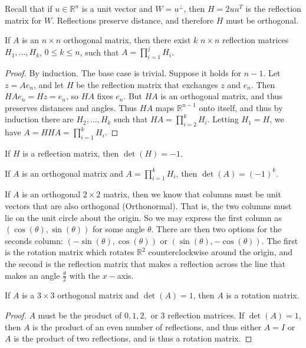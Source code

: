 \documentclass[crop=false,class=book,oneside]{standalone}
\begin{document}
        Recall that if $u\in \mathbb{R}^n$ is a unit vector and $W = u^{\perp}$, then $H=2uu^T$ is the reflection matrix for $W$. Reflections preserve distance, and therefore $H$ must be orthogonal.
        \newpage
        \begin{theorem}
        If $A$ is an $n\times n$ orthogonal matrix, then there exist $k$ $n\times n$ reflection matrices $H_1,\hdots, H_k$, $0\leq k \leq n$, such that $A = \prod_{i=1}^{j}H_i$.
        \end{theorem}
        \begin{proof}
        By induction. The base case is trivial. Suppose it holds for $n-1$. Let $z = Ae_n$, and let $H$ be the reflection matrix that exchanges $z$ and $e_n$. Then $HAe_n = Hz = e_n$, so $HA$ fixes $e_n$. But $HA$ is an orthogonal matrix, and thus preserves distances and angles. Thus $HA$ maps $\mathbb{R}^{n-1}$ onto itself, and thus by induction there are $H_2,\hdots, H_k$ such that $HA = \prod_{i=2}^{k} H_i$. Letting $H_{1}=H$, we have $A = HHA = \prod_{i=1}^{k}H_i$.
        \end{proof}
        \begin{theorem}
        If $H$ is a reflection matrix, then $\det(H) = -1$.
        \end{theorem}
        \begin{theorem}
        If $A$ is an orthogonal matrix and $A=\prod_{i=1}^{k} H_i$, then $\det(A) = (-1)^k$.
        \end{theorem}
        If $A$ is an orthogonal $2\times 2$ matrix, then we know that columns must be unit vectors that are also orthogonal (Orthonormal). That is, the two columns must lie on the unit circle about the origin. So we may express the first column as $(\cos(\theta),\sin(\theta))$ for some angle $\theta$. There are then two options for the seconds column: $(-\sin(\theta),\cos(\theta))$ or $(\sin(\theta),-\cos(\theta))$. The first is the rotation matrix which rotates $\mathbb{R}^2$ counterclockwise around the origin, and the second is the reflection matrix that makes a reflection across the line that makes an angle $\frac{\theta}{2}$ with the $x-$axis. 
        \begin{theorem}
        If $A$ is a $3\times 3$ orthogonal matrix and $\det(A) = 1$, then $A$ is a rotation matrix.
        \end{theorem}
        \begin{proof}
        $A$ must be the product of $0,1,2,$ or $3$ reflection matrices. If $\det(A) = 1$, then $A$ is the product of an even number of reflections, and thus either $A=I$ or $A$ is the product of two reflections, and is thus a rotation matrix.
        \end{proof}
\end{document}
